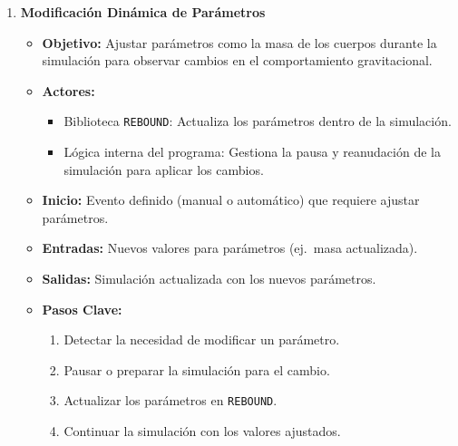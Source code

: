 \begin{enumerate}
    \item \textbf{Modificación Dinámica de Parámetros}
        \begin{itemize}
            \item \textbf{Objetivo:} Ajustar parámetros como la masa de los cuerpos durante la simulación para observar cambios en el comportamiento gravitacional.
            \item \textbf{Actores:}
                \begin{itemize}
                    \item Biblioteca \texttt{REBOUND}: Actualiza los parámetros dentro de la simulación.
                    \item Lógica interna del programa: Gestiona la pausa y reanudación de la simulación para aplicar los cambios.
                \end{itemize}
            \item \textbf{Inicio:} Evento definido (manual o automático) que requiere ajustar parámetros.
            \item \textbf{Entradas:} Nuevos valores para parámetros (ej.\ masa actualizada).
            \item \textbf{Salidas:} Simulación actualizada con los nuevos parámetros.
            \item \textbf{Pasos Clave:}
                \begin{enumerate}
                    \item Detectar la necesidad de modificar un parámetro.
                    \item Pausar o preparar la simulación para el cambio.
                    \item Actualizar los parámetros en \texttt{REBOUND}.
                    \item Continuar la simulación con los valores ajustados.
                \end{enumerate}
        \end{itemize}


\end{enumerate}
